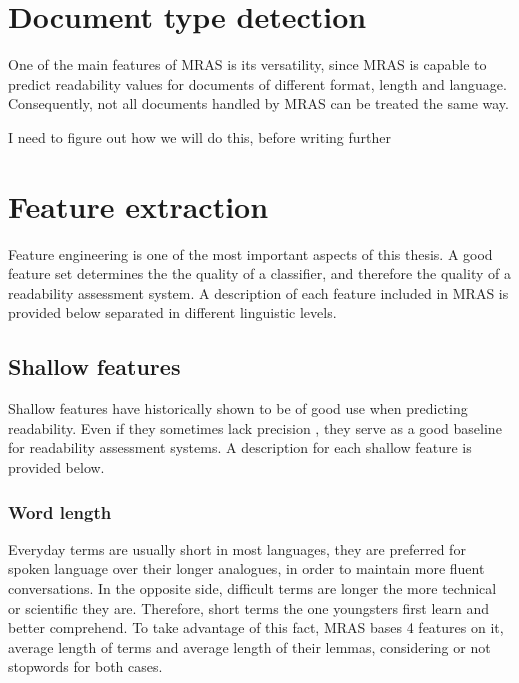\documentclass{bsu-ms}
\newcommand{\projectName}{MRAS\xspace}
\begin{document}
\section{Document type detection}
One of the main features of \projectName is its versatility, since \projectName is capable to predict readability values for documents of different format, length and language. Consequently, not all documents handled by \projectName can be treated the same way.



{\color{red} I need to figure out how we will do this, before writing further}








\section{Feature extraction}
\label{sec:features}
Feature engineering is one of the most important aspects of this thesis. A good feature set determines the the quality of a classifier, and therefore the quality of a readability assessment system. A description of each feature included in \projectName is provided below separated in different linguistic levels.


\subsection{Shallow features}

Shallow features \cite{flesch1948new,chall1995readability,albright1996readability} have historically shown to be of good use when predicting readability. Even if they sometimes lack precision \cite{davison1982failure}, they serve as a good baseline for readability assessment systems. A description for each shallow feature is provided below.

\subsubsection*{Word length}
Everyday terms are usually short in most languages, they are preferred for spoken language over their longer analogues, in order to maintain more fluent conversations. In the opposite side, difficult terms are longer the more technical or scientific they are. Therefore, short terms the one youngsters first learn and better comprehend. To take advantage of this fact, \projectName bases 4 features on it,  average length of terms and average length of their lemmas, considering or not stopwords for both cases.
\end{document}
